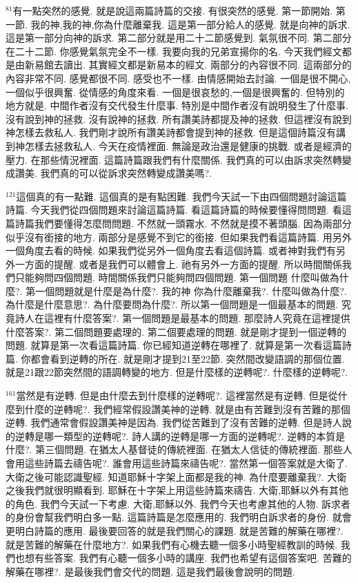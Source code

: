 \documentclass{book}
\begin{document}
$^{81}$有一點突然的感覺.
就是說這兩篇詩篇的交接.
有很突然的感覺.
第一節開始.
第一節.
我的神,我的神,你為什麼離棄我.
這是第一部分給人的感覺.
就是向神的訴求.
這是第一部分向神的訴求.
第二部分就是用二十二節感覺到.
氣氛很不同.
第二部分在二十二節.
你感覺氣氛完全不一樣.
我要向我的兄弟宣揚你的名.
今天我們經文都是由新易館去讀出.
其實經文都是新易本的經文.
兩部分的內容很不同.
這兩部分的內容非常不同.
感覺都很不同.
感受也不一樣.
由情感開始去討論.
一個是很不開心,一個似乎很興奮.
從情感的角度來看.
一個是很哀愁的,一個是很興奮的.
但特別的地方就是.
中間作者沒有交代發生什麼事.
特別是中間作者沒有說明發生了什麼事.
沒有說到神的拯救.
沒有說神的拯救.
所有讚美詩都提及神的拯救.
但這裡沒有說到神怎樣去救私人.
我們剛才說所有讚美詩都會提到神的拯救.
但是這個詩篇沒有講到神怎樣去拯救私人.
今天在疫情裡面.
無論是政治還是健康的挑戰.
或者是經濟的壓力.
在那些情況裡面.
這篇詩篇跟我們有什麼關係.
我們真的可以由訴求突然轉變成讚美.
我們真的可以從訴求突然轉變成讚美嗎?.

$^{121}$這個真的有一點難.
這個真的是有點困難.
我們今天試一下由四個問題討論這篇詩篇.
今天我們從四個問題來討論這篇詩篇.
看這篇詩篇的時候要懂得問問題.
看這篇詩篇我們要懂得怎麼問問題.
不然就一頭霧水.
不然就是摸不著頭腦.
因為兩部分似乎沒有銜接的地方.
兩部分是感覺不到它的銜接.
但如果我們看這篇詩篇.
用另外一個角度去看的時候.
如果我們從另外一個角度去看這個詩篇.
或者神對我們有另外一方面的提醒.
或者是我們可以體會上.
祂有另外一方面的提醒.
所以時間關係我們只能夠問四個問題.
時間關係我們只能夠問四個問題.
第一個問題 什麼叫做為什麼?.
第一個問題就是什麼是為什麼?.
我的神 你為什麼離棄我?.
什麼叫做為什麼?.
為什麼是什麼意思?.
為什麼要問為什麼?.
所以第一個問題是一個最基本的問題.
究竟詩人在這裡有什麼答案?.
第一個問題是最基本的問題.
那麼詩人究竟在這裡提供什麼答案?.
第二個問題要處理的.
第二個要處理的問題.
就是剛才提到一個逆轉的問題.
就算是第一次看這篇詩篇.
你已經知道逆轉在哪裡了.
就算是第一次看這篇詩篇.
你都會看到逆轉的所在.
就是剛才提到21至22節.
突然間改變語調的那個位置.
就是21跟22節突然間的語調轉變的地方.
但是什麼樣的逆轉呢?.
什麼樣的逆轉呢?.

$^{161}$當然是有逆轉.
但是由什麼去到什麼樣的逆轉呢?.
這裡當然是有逆轉.
但是從什麼到什麼的逆轉呢?.
我們經常假設讚美神的逆轉.
就是由有苦難到沒有苦難的那個逆轉.
我們通常會假設讚美神是因為.
我們從苦難到了沒有苦難的逆轉.
但是詩人說的逆轉是哪一類型的逆轉呢?.
詩人講的逆轉是哪一方面的逆轉呢?.
逆轉的本質是什麼?.
第三個問題.
在猶太人基督徒的傳統裡面.
在猶太人信徒的傳統裡面.
那些人會用這些詩篇去禱告呢?.
誰會用這些詩篇來禱告呢?.
當然第一個答案就是大衛了.
大衛之後可能認識聖經.
知道耶穌十字架上面都是我的神.
為什麼要離棄我?.
大衛之後我們就很明顯看到.
耶穌在十字架上用這些詩篇來禱告.
大衛,耶穌以外有其他的角色.
我們今天試一下考慮.
大衛,耶穌以外.
我們今天也考慮其他的人物.
訴求者的身份會幫我們明白多一點.
這篇詩篇是怎麼應用的.
我們明白訴求者的身份.
就會更明白詩篇的應用.
最後要回答的就是我們關心的課題.
就是苦難的解藥在哪裡?.
就是苦難的解藥在什麼地方?.
如果我們有心機去聽一個多小時聖經教訓的時候.
我們也想有些答案.
我們有心聽一個多小時的講座.
我們也希望有這個答案吧.
苦難的解藥在哪裡?.
是最後我們會交代的問題.
這是我們最後會說明的問題.
\end{document}

